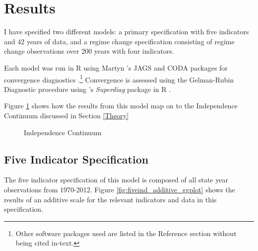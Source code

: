 \documentclass[12pt]{article}
\begin{document}
\section{Results}\label{Results}
I have specified two different models: a primary specification with five indicators and 42 years of data, and a regime change specification consisting of regime change observations over 200 years with four indicators.

Each model was run in R using Martyn \citeauthor{r-rjags}'s JAGS and CODA packages for convergence diagnostics \citep{R,r-CODA,r-rjags}.\footnote{Other software packages used are listed in the Reference section without being cited in-text.}  Convergence is assessed using the Gelman-Rubin Diagnostic procedure using \citeauthor{r-superdiag}'s \textit{Superdiag} package in R \citep{Gelman1992,R}.

\nocite{R,r-CODA,r-Foreign,r-R2jags,r-ggplot2,r-dplyr,r-rjagsr-doParallel,r-rcurl,r-random,r-superdiag,r-polycor}

Figure \ref{continuumresults} shows how the results from this model map on to the Independence Continuum discussed in Section \ref{Theory}

\begin{figure}[tbh]\centering\caption{Independence Continuum}\label{continuumresults}
\end{figure}

\subsection{Five Indicator Specification}
The five indicator specification of this model is composed of all state year observations from 1970-2012.  Figure \ref{fig:fiveind_additive_ggplot} shows the results of an additive scale for the relevant indicators and data in this specification.  
\end{document}
